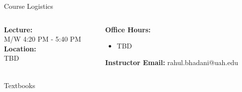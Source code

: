 \documentclass[aspectratio=169,xcolor=dvipsnames,svgnames,x11names,fleqn]{beamer}
\begin{document}

\begin{frame}{Course Logistics
}
  \begin{columns}[T] %
    \begin{column}{0.5\textwidth}
      \textbf{Lecture:} \\
      M/W 4:20 PM - 5:40 PM \\
      \vspace{0.3cm}
      \textbf{Location:} \\
      TBD \\
      
    \end{column}
    \begin{column}{0.5\textwidth}
      \textbf{Office Hours:}
      \begin{itemize}
        \item TBD
      \end{itemize}
      \textbf{Instructor Email:} rahul.bhadani@uah.edu
    \end{column}
  \end{columns}
\end{frame}

\begin{frame}{Textbooks}

\end{frame}
\end{document}
